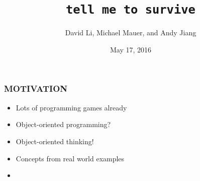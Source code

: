 \documentclass{beamer}
\title{\texttt{tell me to survive}}
\author{David Li, Michael Mauer, and Andy Jiang}
\institute{Cornell University}
\date{May 17, 2016}
\let\theframetitle\frametitle
\renewcommand\frametitle[1]{\theframetitle{\MakeUppercase{#1}}}
\begin{document}
\frame{\titlepage}

\begin{frame}
\frametitle{Motivation}


\begin{itemize}
\item<1-> Lots of programming games already
\item<2-> Object-oriented programming?
\item<3-> Object-oriented thinking!
\item<4-> Concepts from real world examples
\item<5->
\end{itemize}
\end{frame}
\end{document}
